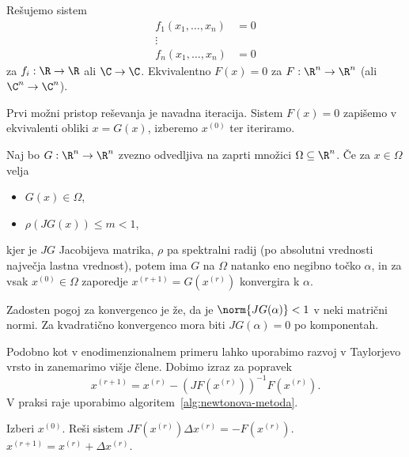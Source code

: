 
Rešujemo sistem
\begin{align*}
  f_1(x_1, \ldots, x_n) &= 0 \\
  \vdots& \\
  f_n(x_1, \ldots, x_n) &= 0
\end{align*}
za $f_i : \R \to \R$ ali $\C \to \C$.
Ekvivalentno $F(x) = 0$ za $F: \R^n \to \R^n$ (ali $\C^n \to \C^n$).

Prvi možni pristop reševanja je navadna iteracija.
Sistem $F(x)=0$ zapišemo v ekvivalenti obliki $x = G(x)$, izberemo $x^{(0)}$ ter
iteriramo.

\begin{izrek}
  Naj bo $G: \R^n \to \R^n$ zvezno odvedljiva na zaprti množici $\Omega
  \subseteq \R^n$.
  Če za $x \in \Omega$ velja
  \begin{itemize}
  \item $G(x) \in \Omega$,
  \item $\rho(JG(x)) \le m < 1$,
  \end{itemize}
  kjer je $JG$ Jacobijeva matrika, $\rho$ pa spektralni radij (po absolutni
  vrednosti največja lastna vrednost), potem ima $G$ na $\Omega$ natanko eno
  negibno točko $\alpha$, in za vsak $x^{(0)} \in \Omega$ zaporedje $x^{(r+1)}
  = G(x^{(r)})$ konvergira k $\alpha$.
\end{izrek}

Zadosten pogoj za konvergenco je že, da je $\norm{JG(\alpha)} < 1$ v neki
matrični normi.
Za kvadratično konvergenco mora biti $JG(\alpha) = 0$ po komponentah.


Podobno kot v enodimenzionalnem primeru lahko uporabimo razvoj v Taylorjevo
vrsto in zanemarimo višje člene.
Dobimo izraz za popravek
\[
  x^{(r+1)} = x^{(r)} - (JF(x^{(r)}))^{-1} F(x^{(r)}).
\]
V praksi raje uporabimo algoritem~\ref{alg:newtonova-metoda}.

\begin{algorithm}
  \caption{Newtonova metoda}
  \label{alg:newtonova-metoda}
  \begin{algorithmic}
	\State Izberi $x^{(0)}$.
	\State Reši sistem $JF(x^{(r)}) \Delta x^{(r)} = -F(x^{(r)})$.
	\State $x^{(r+1)} = x^{(r)} + \Delta x^{(r)}$.
	\EndFor
  \end{algorithmic}
\end{algorithm}

